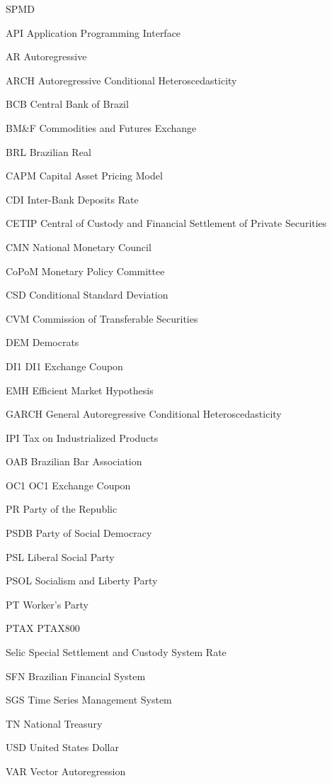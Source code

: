 \documentclass[cic,tc, english]{iiufrgs}
\begin{document}
\listoftables

\begin{listofabbrv}{SPMD}
    
    \item[API] Application Programming Interface
    \item[AR] Autoregressive
    \item[ARCH] Autoregressive Conditional Heteroscedasticity
    \item[BCB] Central Bank of Brazil
    \item[BM\&F] Commodities and Futures Exchange
    \item[BRL] Brazilian Real
    \item[CAPM] Capital Asset Pricing Model
    \item[CDI] Inter-Bank Deposits Rate
    \item[CETIP] Central of Custody and Financial Settlement of Private Securities
    \item[CMN] National Monetary Council
    \item[CoPoM] Monetary Policy Committee
    \item[CSD] Conditional Standard Deviation
    \item[CVM] Commission of Transferable Securities
    \item[DEM] Democrats
    \item[DI1] DI1 Exchange Coupon
    \item[EMH] Efficient Market Hypothesis
    \item[GARCH] General Autoregressive Conditional Heteroscedasticity
    \item[IPI] Tax on Industrialized Products
    \item[OAB] Brazilian Bar Association
    \item[OC1] OC1 Exchange Coupon
    \item[PR] Party of the Republic
    \item[PSDB] Party of Social Democracy
    \item[PSL] Liberal Social Party
    \item[PSOL] Socialism and Liberty Party
    \item[PT] Worker's Party
    \item[PTAX] PTAX800
    \item[Selic] Special Settlement and Custody System Rate
    \item[SFN] Brazilian Financial System
    \item[SGS] Time Series Management System
    \item[TN] National Treasury
    \item[USD] United States Dollar
    \item[VAR] Vector Autoregression

\end{listofabbrv}
\end{document}
